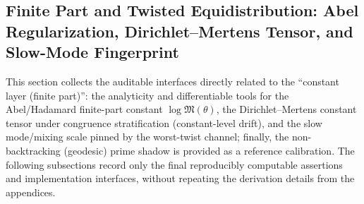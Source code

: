 \subsection{Finite Part and Twisted Equidistribution: Abel Regularization, Dirichlet--Mertens Tensor, and Slow-Mode Fingerprint}\label{subsec:zeta-finite-part-finite-constant}
This section collects the auditable interfaces directly related to the ``constant layer (finite part)'': the analyticity and differentiable tools for the Abel/Hadamard finite-part constant \(\log\mathfrak{M}(\theta)\), the Dirichlet--Mertens constant tensor under congruence stratification (constant-level drift), and the slow mode/mixing scale pinned by the worst-twist channel; finally, the non-backtracking (geodesic) prime shadow is provided as a reference calibration. The following subsections record only the final reproducibly computable assertions and implementation interfaces, without repeating the derivation details from the appendices.
















